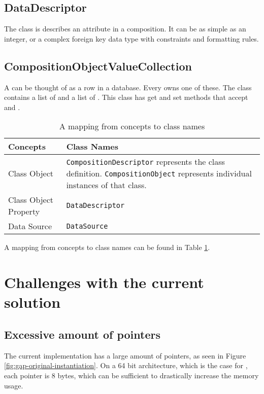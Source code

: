 \subsection{DataDescriptor}
\label{sub:DataDescriptor}
The  class is describes an attribute in a composition. It can be as simple as an integer, or a complex foreign key data type with constraints and formatting rules.

\subsection{CompositionObjectValueCollection}
\label{sub:CompositionObjectValueCollection}
A  can be thought of as a row in a database. Every  owns one of these. The class contains a list of  and a list of . This class has get and set methods that accept  and .

\begin{table}
    \begin{tabularx}{\textwidth}{ X | X }
        Concepts & Class Names \\
        \hline
        Class Object & \texttt{CompositionDescriptor} represents the class definition. \texttt{CompositionObject} represents individual instances of that class.\\
        \hline
        Class Object Property & \texttt{DataDescriptor} \\
        \hline
        Data Source & \texttt{DataSource} \\
    \end{tabularx}
    \caption{A mapping from concepts to class names}
    \label{tab:concept-class-mapping}
\end{table}

A mapping from concepts to class names can be found in Table \ref{tab:concept-class-mapping}.

\section{Challenges with the current solution}
\label{sec:Challenges with the current solution}

\subsection{Excessive amount of pointers}
\label{sub:Excessive amount of pointers}
The current implementation has a large amount of pointers, as seen in Figure \ref{fig:gap-original-instantiation}. On a 64 bit architecture, which is the case for \gap, each pointer is 8 bytes, which can be sufficient to drastically increase the memory usage.

